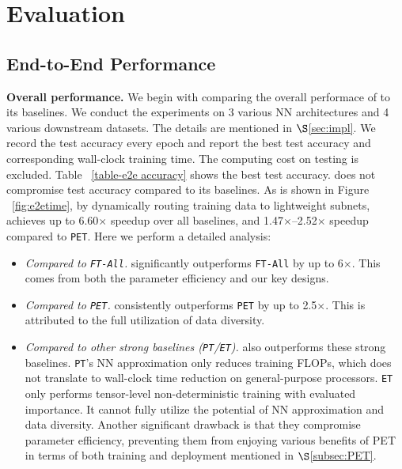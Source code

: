\section{Evaluation}
\subsection{End-to-End Performance}

\noindent \textbf{Overall performance.}
We begin with comparing the overall performace of \sys to its baselines.
We conduct the experiments on 3 various NN architectures and 4 various downstream datasets. 
The details are mentioned in $\S$\ref{sec:impl}.
We record the test accuracy every epoch and report the best test accuracy and corresponding wall-clock training time.
The computing cost on testing is excluded.
Table ~\ref{table-e2e accuracy} shows the best test accuracy.
\sys does not compromise test accuracy compared to its baselines.
As is shown in Figure ~\ref{fig:e2etime}, by dynamically routing training data to lightweight subnets, \sys achieves up to 6.60$\times$ speedup over all baselines, and 1.47$\times$--2.52$\times$ speedup compared to \texttt{PET}. 
Here we perform a detailed analysis:
\begin{itemize}[leftmargin=10pt,topsep=0pt]
\item \textit{Compared to \texttt{FT-All}.}
\sys significantly outperforms \texttt{FT-All} by up to 6$\times$.
This comes from both the parameter efficiency and our key designs.
\item \textit{Compared to \texttt{PET}.}
\sys consistently outperforms \texttt{PET} by up to 2.5$\times$.
This is attributed to the full utilization of data diversity.
\item \textit{Compared to other strong baselines (\texttt{PT}/\texttt{ET}).}
\sys also outperforms these strong baselines.
\texttt{PT}'s NN approximation only reduces training FLOPs, which does not translate to wall-clock time reduction on general-purpose processors.
\texttt{ET} only performs tensor-level non-deterministic training with evaluated importance. It cannot fully utilize the potential of NN approximation and data diversity.
Another significant drawback is that they compromise parameter efficiency, preventing them from enjoying various benefits of PET in terms of both training and deployment mentioned in $\S$\ref{subsec:PET}.
\end{itemize}

